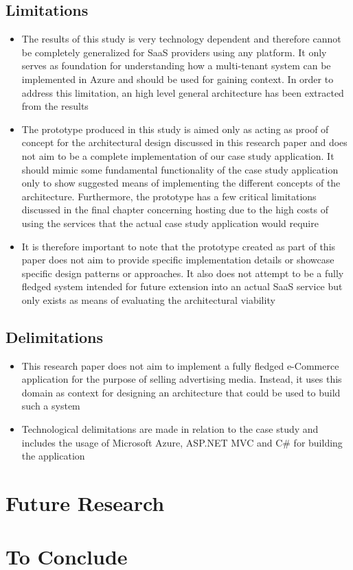 \subsection{Limitations}
\begin{itemize}
\item The results of this study is very technology dependent and therefore cannot be completely generalized for SaaS providers using any platform. It only serves as foundation for understanding how a multi-tenant system can be implemented in Azure and should be used for gaining context. In order to address this limitation, an high level general architecture has been extracted from the results
\item The prototype produced in this study is aimed only as acting as proof of concept for the architectural design discussed in this research paper and does not aim to be a complete implementation of our case study application. It should mimic some fundamental functionality of the case study application only to show suggested means of implementing the different concepts of the architecture. Furthermore, the prototype has a few critical limitations discussed in the final chapter concerning hosting due to the high costs of using the services that the actual case study application would require
\item It is therefore important to note that the prototype created as part of this paper does not aim to provide specific implementation details or showcase specific design patterns or approaches. It also does not attempt to be a fully fledged system intended for future extension into an actual SaaS service but only exists as means of evaluating the architectural viability
\end{itemize}

\subsection{Delimitations}
\begin{itemize}
\item This research paper does not aim to implement a fully fledged e-Commerce application for the purpose of selling advertising media. Instead, it uses this domain as context for designing an architecture that could be used to build such a system
\item Technological delimitations are made in relation to the case study and includes the usage of Microsoft Azure, ASP.NET  MVC and C\# for building the application
\end{itemize}

\section{Future Research}

\section{To Conclude}
